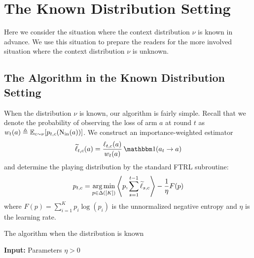 \section{The Known Distribution Setting}
Here we consider the situation where the context distribution $\nu$ is known in advance. We use this situation to prepare the readers for the more involved situation where the context distribution $\nu$ is unknown.


\subsection{The Algorithm in the Known Distribution Setting}
When the distribution $\nu$ is known, our algorithm is fairly simple. 
%
Recall that we denote the probability of observing the loss of arm $a$ at round $t$ as $w_t(a) \triangleq \mathbb{E}_{c \sim \nu}[p_{t,c}(\operatorname{N_{\text{in}}}(a))]$.
%
We construct an importance-weighted estimator 
\[\widetilde{\ell}_{t,c}(a) = \frac{\ell_{t,c}(a)}{w_t(a)} \indi(a_t \rightarrow a)\]
and determine the playing distribution by the standard FTRL subroutine:
\[p_{t,c} = \underset{p \in \Delta([K])}{\operatorname*{arg\,min}} \left\langle p, \sum_{s=1}^{t-1} \widetilde{\ell}_{s,c} \right\rangle - \frac{1}{\eta} F(p)\]
where $F(p) = \sum_{i=1}^K p_i \log(p_i)$ is the unnormalized negative entropy and $\eta$ is the learning rate.

\begin{algorithm}
\label{alg: known}
\caption{The algorithm when the distribution is known}
\textbf{Input:} Parameters $\eta > 0$\\
\end{algorithm}

